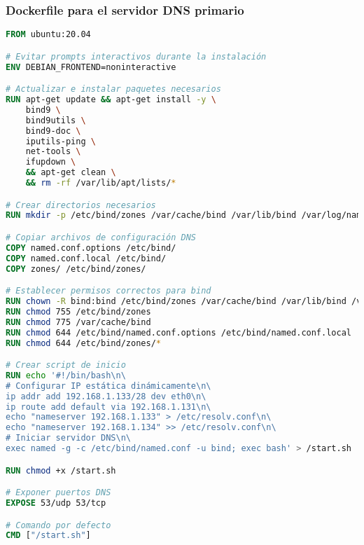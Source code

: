 \subsubsection*{Dockerfile para el servidor DNS primario}
\begin{lstlisting}[language=Dockerfile]
  FROM ubuntu:20.04

# Evitar prompts interactivos durante la instalación
ENV DEBIAN_FRONTEND=noninteractive

# Actualizar e instalar paquetes necesarios
RUN apt-get update && apt-get install -y \
    bind9 \
    bind9utils \
    bind9-doc \
    iputils-ping \
    net-tools \
    ifupdown \
    && apt-get clean \
    && rm -rf /var/lib/apt/lists/*

# Crear directorios necesarios
RUN mkdir -p /etc/bind/zones /var/cache/bind /var/lib/bind /var/log/named

# Copiar archivos de configuración DNS
COPY named.conf.options /etc/bind/
COPY named.conf.local /etc/bind/
COPY zones/ /etc/bind/zones/

# Establecer permisos correctos para bind
RUN chown -R bind:bind /etc/bind/zones /var/cache/bind /var/lib/bind /var/log/named
RUN chmod 755 /etc/bind/zones
RUN chmod 775 /var/cache/bind
RUN chmod 644 /etc/bind/named.conf.options /etc/bind/named.conf.local
RUN chmod 644 /etc/bind/zones/*

# Crear script de inicio
RUN echo '#!/bin/bash\n\
# Configurar IP estática dinámicamente\n\
ip addr add 192.168.1.133/28 dev eth0\n\
ip route add default via 192.168.1.131\n\
echo "nameserver 192.168.1.133" > /etc/resolv.conf\n\
echo "nameserver 192.168.1.134" >> /etc/resolv.conf\n\
# Iniciar servidor DNS\n\
exec named -g -c /etc/bind/named.conf -u bind; exec bash' > /start.sh

RUN chmod +x /start.sh

# Exponer puertos DNS
EXPOSE 53/udp 53/tcp

# Comando por defecto
CMD ["/start.sh"] 
\end{lstlisting}

